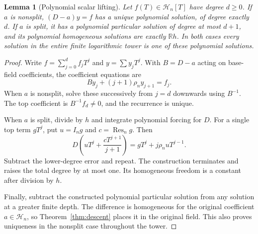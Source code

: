 \documentclass[11pt,a4paper]{article}
\numberwithin{equation}{section}
\newtheorem{lemma}[theorem]{Lemma}
\theoremstyle{definition}
\theoremstyle{remark}\newtheorem{remark}[theorem]{Remark}
\newcommand{\R}{\mathbb R}\newcommand{\C}{\mathbb C}
\newcommand{\Hh}{\mathcal H}\newcommand{\Ll}{\mathcal L}
\newcommand{\Res}{\operatorname{Res}}\newcommand{\supp}{\operatorname{supp}}
\begin{document}
\begin{lemma}[Polynomial scalar lifting]
\label{lem:polynomial}
Let $f(T)\in\Hh_n[T]$ have degree $d\ge0$. If $a$ is nonsplit, $(D-a)y=f$ has a unique polynomial solution, of degree exactly $d$. If $a$ is split, it has a polynomial particular solution of degree at most $d+1$, and its polynomial homogeneous solutions are exactly $\R h$. In both cases every solution in the entire finite logarithmic tower is one of these polynomial solutions.
\end{lemma}
\begin{proof}
Write $f=\sum_{j=0}^d f_jT^j$ and $y=\sum y_jT^j$. With $B=D-a$ acting on base-field coefficients, the coefficient equations are
\begin{equation}
 B y_j+(j+1)\rho_n y_{j+1}=f_j.
 \label{eq:coefficientrecursion}
\end{equation}
When $a$ is nonsplit, solve these successively from $j=d$ downwards using $B^{-1}$. The top coefficient is $B^{-1}f_d\ne0$, and the recurrence is unique.

When $a$ is split, divide by $h$ and integrate polynomial forcing for $D$. For a single top term $gT^j$, put $u=I_ng$ and $c=\Res_n g$. Then
\[
 D\left(uT^j+\frac{cT^{j+1}}{j+1}\right)
 =gT^j+j\rho_n uT^{j-1}.
\]
Subtract the lower-degree error and repeat. The construction terminates and raises the total degree by at most one. Its homogeneous freedom is a constant after division by $h$.

Finally, subtract the constructed polynomial particular solution from any solution at a greater finite depth. The difference is homogeneous for the original coefficient $a\in\Hh_n$, so Theorem~\ref{thm:descent} places it in the original field. This also proves uniqueness in the nonsplit case throughout the tower.
\end{proof}
\end{document}
